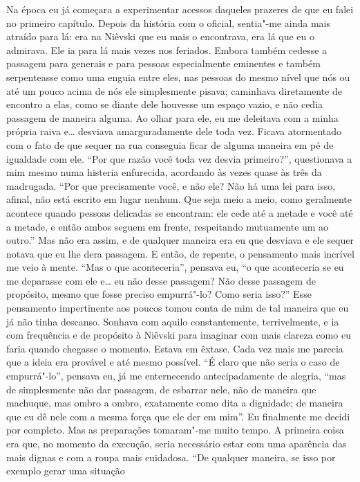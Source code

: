 Na época eu já começara a experimentar acessos daqueles prazeres de que
eu falei no primeiro capítulo. Depois da história com o oficial,
sentia"-me ainda mais atraído para lá: era na Niêvski que eu mais o
encontrava, era lá que eu o admirava. Ele ia para lá mais vezes nos
feriados. Embora também cedesse a passagem para generais e para pessoas
especialmente eminentes e também serpenteasse como uma enguia entre
eles, nas pessoas do mesmo nível que nós ou até um pouco acima de nós
ele simplesmente pisava; caminhava diretamente de encontro a elas, como
se diante dele houvesse um espaço vazio, e não cedia passagem de
maneira alguma. Ao olhar para ele, eu me deleitava com a minha própria
raiva e\ldots{} desviava amarguradamente dele toda vez. Ficava atormentado
com o fato de que sequer na rua conseguia ficar de alguma maneira em pé
de igualdade com ele. “Por que razão você toda vez desvia primeiro?”,
questionava a mim mesmo numa histeria enfurecida, acordando às vezes
quase às três da madrugada. “Por que precisamente você, e não ele? Não
há uma lei para isso, afinal, não está escrito em lugar nenhum. Que
seja meio a meio, como geralmente acontece quando pessoas delicadas se
encontram: ele cede até a metade e você até a metade, e então ambos
seguem em frente, respeitando mutuamente um ao outro.” Mas não era
assim, e de qualquer maneira era eu que desviava e ele sequer notava
que eu lhe dera passagem. E então, de repente, o pensamento mais
incrível me veio à mente. “Mas o que aconteceria”, pensava eu, “o que
aconteceria se eu me deparasse com ele e\ldots{} eu não desse passagem? Não
desse passagem de propósito, mesmo que fosse preciso empurrá"-lo? Como
seria isso?” Esse pensamento impertinente aos poucos tomou conta de
mim de tal maneira que eu já não tinha descanso. Sonhava com aquilo
constantemente, terrivelmente, e ia com frequência e de propósito à
Niêvski para imaginar com mais clareza como eu faria quando chegasse o
momento. Estava em êxtase. Cada vez mais me parecia que a ideia era
provável e até mesmo possível. “É claro que não seria o caso de
empurrá"-lo”, pensava eu, já me enternecendo antecipadamente de alegria,
“mas de simplesmente não dar passagem, de esbarrar nele, não de maneira
que machuque, mas ombro a ombro, exatamente como dita a dignidade; de
maneira que eu dê nele com a mesma força que ele der em mim”. Eu
finalmente me decidi por completo. Mas as preparações tomaram"-me muito
tempo. A primeira coisa era que, no momento da execução, seria
necessário estar com uma aparência das mais dignas e com a roupa mais
cuidadosa. “De qualquer maneira, se isso por exemplo gerar uma situação

